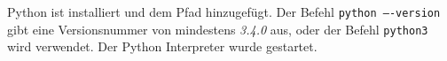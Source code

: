 Python ist installiert und dem Pfad hinzugefügt. Der Befehl
\texttt{python ----version} gibt eine Versionsnummer von mindestens \textit{3.4.0}
aus, oder der Befehl \texttt{python3} wird verwendet. Der Python Interpreter
wurde gestartet.
